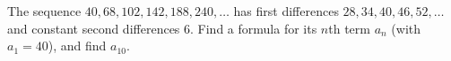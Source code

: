 The sequence $40,68,102,142,188,240,\dots$ has first differences $28,34,40,46,52,\dots$ and constant second differences $6$. Find a formula for its $n$th term $a_n$ (with $a_1=40$), and find $a_{10}$.
